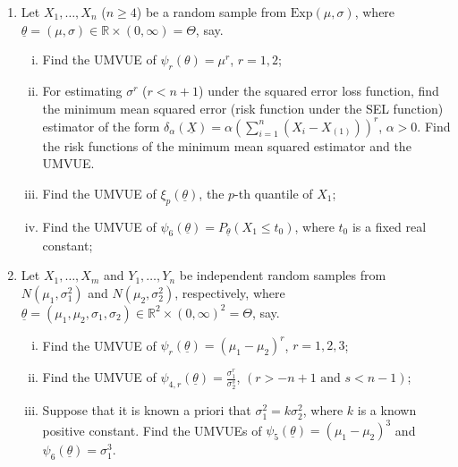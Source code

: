 \documentclass[12pt]{article}
\begin{document}
\begin{enumerate}
    \item Let $X_{1}, \dots, X_{n}$ ($n \ge 4$) be a random sample from $\text{Exp}(\mu, \sigma)$, where $\underline{\theta} = (\mu, \sigma) \in \mathbb{R} \times (0, \infty) = \Theta$, say.
    \begin{enumerate}[(i)]
        \item Find the UMVUE of $\psi_{r}(\theta) = \mu^{r}$, $r = 1, 2$;
        \item For estimating $\sigma^{r}$ ($r < n+1$) under the squared error loss function, find the minimum mean squared error (risk function under the SEL function) estimator of the form $\delta_{\alpha}(\underline{X}) = \alpha (\sum_{i=1}^{n}(X_{i} - X_{(1)}))^{r}$, $\alpha > 0$. Find the risk functions of the minimum mean squared estimator and the UMVUE.
        \item Find the UMVUE of $\xi_{p}(\underline{\theta})$, the $p$-th quantile of $X_{1}$;
        \item Find the UMVUE of $\psi_{6}(\underline{\theta}) = P_{\underline{\theta}}(X_{1} \le t_{0})$, where $t_{0}$ is a fixed real constant;
    \end{enumerate}

    \item Let $X_{1}, \dots, X_{m}$ and $Y_{1}, \dots, Y_{n}$ be independent random samples from $N(\mu_{1}, \sigma_{1}^{2})$ and $N(\mu_{2}, \sigma_{2}^{2})$, respectively, where $\underline{\theta} = (\mu_{1}, \mu_{2}, \sigma_{1}, \sigma_{2}) \in \mathbb{R}^{2} \times (0, \infty)^{2} = \Theta$, say.
    \begin{enumerate}[(i)]
        \item Find the UMVUE of $\psi_{r}(\underline{\theta}) = (\mu_{1} - \mu_{2})^{r}$, $r = 1, 2, 3$;
        \item Find the UMVUE of $\psi_{4,r}(\underline{\theta}) = \frac{\sigma_{1}^{r}}{\sigma_{2}^{s}}$, $(r > -n+1 \text{ and } s < n-1)$;
        \item Suppose that it is known a priori that $\sigma_{1}^{2} = k\sigma_{2}^{2}$, where $k$ is a known positive constant. Find the UMVUEs of $\psi_{5}(\underline{\theta}) = (\mu_{1} - \mu_{2})^{3}$ and $\psi_{6}(\underline{\theta}) = \sigma_{1}^{3}$.
    \end{enumerate}


\end{enumerate}
\end{document}
